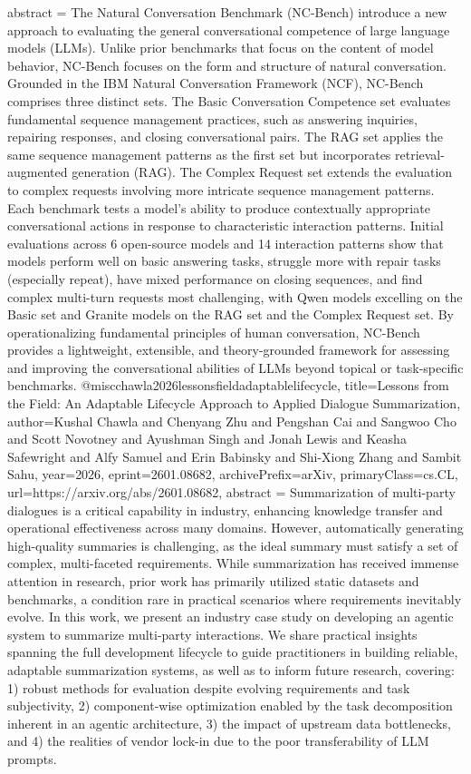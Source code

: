 {      abstract = {The Natural Conversation Benchmark (NC-Bench) introduce a new approach to evaluating the general conversational competence of large language models (LLMs). Unlike prior benchmarks that focus on the content of model behavior, NC-Bench focuses on the form and structure of natural conversation. Grounded in the IBM Natural Conversation Framework (NCF), NC-Bench comprises three distinct sets. The Basic Conversation Competence set evaluates fundamental sequence management practices, such as answering inquiries, repairing responses, and closing conversational pairs. The RAG set applies the same sequence management patterns as the first set but incorporates retrieval-augmented generation (RAG). The Complex Request set extends the evaluation to complex requests involving more intricate sequence management patterns. Each benchmark tests a model's ability to produce contextually appropriate conversational actions in response to characteristic interaction patterns. Initial evaluations across 6 open-source models and 14 interaction patterns show that models perform well on basic answering tasks, struggle more with repair tasks (especially repeat), have mixed performance on closing sequences, and find complex multi-turn requests most challenging, with Qwen models excelling on the Basic set and Granite models on the RAG set and the Complex Request set. By operationalizing fundamental principles of human conversation, NC-Bench provides a lightweight, extensible, and theory-grounded framework for assessing and improving the conversational abilities of LLMs beyond topical or task-specific benchmarks.}
}@misc{chawla2026lessonsfieldadaptablelifecycle,
      title={Lessons from the Field: An Adaptable Lifecycle Approach to Applied Dialogue Summarization}, 
      author={Kushal Chawla and Chenyang Zhu and Pengshan Cai and Sangwoo Cho and Scott Novotney and Ayushman Singh and Jonah Lewis and Keasha Safewright and Alfy Samuel and Erin Babinsky and Shi-Xiong Zhang and Sambit Sahu},
      year={2026},
      eprint={2601.08682},
      archivePrefix={arXiv},
      primaryClass={cs.CL},
      url={https://arxiv.org/abs/2601.08682},
      abstract = {Summarization of multi-party dialogues is a critical capability in industry, enhancing knowledge transfer and operational effectiveness across many domains. However, automatically generating high-quality summaries is challenging, as the ideal summary must satisfy a set of complex, multi-faceted requirements. While summarization has received immense attention in research, prior work has primarily utilized static datasets and benchmarks, a condition rare in practical scenarios where requirements inevitably evolve. In this work, we present an industry case study on developing an agentic system to summarize multi-party interactions. We share practical insights spanning the full development lifecycle to guide practitioners in building reliable, adaptable summarization systems, as well as to inform future research, covering: 1) robust methods for evaluation despite evolving requirements and task subjectivity, 2) component-wise optimization enabled by the task decomposition inherent in an agentic architecture, 3) the impact of upstream data bottlenecks, and 4) the realities of vendor lock-in due to the poor transferability of LLM prompts.}
}
